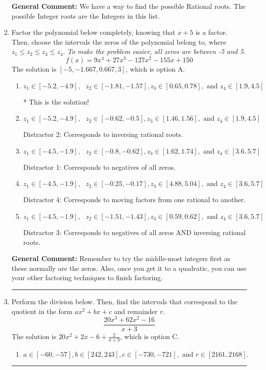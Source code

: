 \documentclass{extbook}[14pt]
\newcommand{\litem}[1]{\item #1

\rule{\textwidth}{0.4pt}}
\begin{document}
\begin{enumerate}
{\textbf{General Comment:} We have a way to find the possible Rational roots. The possible Integer roots are the Integers in this list.
}
\litem{
Factor the polynomial below completely, knowing that $x + 5$ is a factor. Then, choose the intervals the zeros of the polynomial belong to, where $z_1 \leq z_2 \leq z_3 \leq z_4$. \textit{To make the problem easier, all zeros are between -5 and 5.}
\[ f(x) = 9x^{4} +27 x^{3} -127 x^{2} -155 x + 150 \]The solution is \( [-5, -1.667, 0.667, 3] \), which is option A.\begin{enumerate}[label=\Alph*.]
\item \( z_1 \in [-5.2, -4.9], \text{   }  z_2 \in [-1.81, -1.57], z_3 \in [0.65, 0.78], \text{   and   } z_4 \in [1.9, 4.5] \)

* This is the solution!
\item \( z_1 \in [-5.2, -4.9], \text{   }  z_2 \in [-0.62, -0.5], z_3 \in [1.46, 1.56], \text{   and   } z_4 \in [1.9, 4.5] \)

 Distractor 2: Corresponds to inversing rational roots.
\item \( z_1 \in [-4.5, -1.9], \text{   }  z_2 \in [-0.8, -0.62], z_3 \in [1.62, 1.74], \text{   and   } z_4 \in [3.6, 5.7] \)

 Distractor 1: Corresponds to negatives of all zeros.
\item \( z_1 \in [-4.5, -1.9], \text{   }  z_2 \in [-0.25, -0.17], z_3 \in [4.88, 5.04], \text{   and   } z_4 \in [3.6, 5.7] \)

 Distractor 4: Corresponds to moving factors from one rational to another.
\item \( z_1 \in [-4.5, -1.9], \text{   }  z_2 \in [-1.51, -1.43], z_3 \in [0.59, 0.62], \text{   and   } z_4 \in [3.6, 5.7] \)

 Distractor 3: Corresponds to negatives of all zeros AND inversing rational roots.
\end{enumerate}

\textbf{General Comment:} Remember to try the middle-most integers first as these normally are the zeros. Also, once you get it to a quadratic, you can use your other factoring techniques to finish factoring.
}
\litem{
Perform the division below. Then, find the intervals that correspond to the quotient in the form $ax^2+bx+c$ and remainder $r$.
\[ \frac{20x^{3} +62 x^{2} -16}{x + 3} \]The solution is \( 20x^{2} +2 x -6 + \frac{2}{x + 3} \), which is option C.\begin{enumerate}[label=\Alph*.]
\item \( a \in [-60, -57], b \in [242, 243], c \in [-730, -721], \text{ and } r \in [2161, 2168]. \)


\end{enumerate}}
\end{enumerate}
\end{document}
